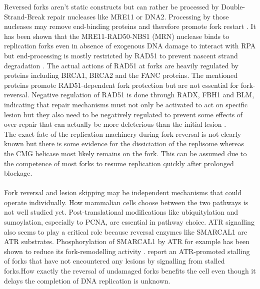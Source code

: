 Reversed forks aren't static constructs but can rather be processed by Double-Strand-Break repair nucleases like MRE11 or DNA2. Processing by those nucleases may remove end-binding proteins and therefore promote fork restart \citep{TeixeiraSilva.2017}. It has been shown that the MRE11-RAD50-NBS1 (MRN) nuclease binds to replication forks even in absence of exogenous DNA damage to interact with RPA but end-processing is mostly restricted by RAD51 to prevent nascent strand degradation \citep{Mijic.2017, Dungrawala.2015}. The actual actions of RAD51 at forks are heavily regulated by proteins including BRCA1, BRCA2 and the FANC proteins. The mentioned proteins promote RAD51-dependent fork protection but are not essential for fork-reversal. Negative regulation of RAD51 is done through RADX, FBH1 and BLM, indicating that repair mechanisms must not only be activated to act on specific lesion but they also need to be negatively regulated to prevent some effects of over-repair that can actually be more deleterious than the initial lesion \citep{Bhat.2018}.\\
The exact fate of the replication machinery during fork-reversal is not clearly known but there is some evidence for the dissiciation of the replisome \citep{Dungrawala.2015} whereas the CMG helicase most likely remains on the fork. This can be assumed due to the competence of most forks to resume replication quickly after prolonged blockage.\\\\
Fork reversal and lesion skipping may be independent mechanisms that could operate individually. How mammalian cells choose between the two pathways is not well studied yet. Post-translational modifications like ubiquitylation and sumoylation, especially to PCNA, are essential in pathway choice. ATR signalling also seems to play a critical role because reversal enzymes like SMARCAL1 are ATR substrates. Phosphorylation of SMARCAL1 by ATR for example has been shown to reduce its fork-remodelling activity \citep{Couch.2013}. \cite{Mutreja.2018} report an ATR-promoted stalling of forks that have not encountered any lesions by signalling from stalled forks.How exactly the reversal of undamaged forks benefits the cell even though it delays the completion of DNA replication is unknown.


